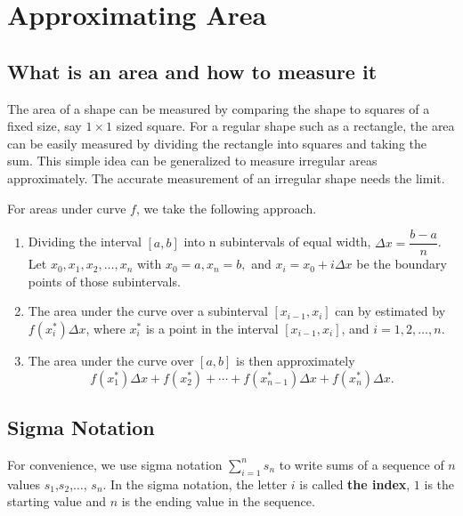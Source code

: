 
\hypertarget{approximating-area}{%
\section{Approximating Area}\label{approximating-area}}

\hypertarget{what-is-an-area-and-how-to-measure-it}{%
\subsection{What is an area and how to measure
it}\label{what-is-an-area-and-how-to-measure-it}}

The area of a shape can be measured by comparing the shape to squares of
a fixed size, say \(1\times1\) sized square. For a regular shape such as
a rectangle, the area can be easily measured by dividing the rectangle
into squares and taking the sum. This simple idea can be generalized to
measure irregular areas approximately. The accurate measurement of an
irregular shape needs the limit.

For areas under curve \(f\), we take the following approach.

\begin{enumerate}[sepno]
\item
  Dividing the interval \([a,b]\) into n subintervals of equal width,
  \(\Delta x=\dfrac{b - a}{n}\). Let \(x_0,x_1,x_2, \dots ,x_n\) with
  \(x_0=a,x_n=b,\) and \(x_i=x_0+i\Delta x\) be the boundary points of
  those subintervals.
\item
  The area under the curve over a subinterval \([x_{i-1}, x_i]\) can by
  estimated by \(f(x_i^*)\Delta x\), where \(x_i^*\) is a point in the
  interval \([x_{i-1}, x_i]\), and \(i=1,2,\dots, n\).
\item
  The area under the curve over \([a, b]\) is then approximately
  \[ f(x_1^*)\Delta x+f(x_2^*)+\cdots +f(x_{n-1}^*)\Delta x+f(x_n^*)\Delta x.\]
\end{enumerate}



\hypertarget{sigma-notation}{%
\subsection{Sigma Notation}\label{sigma-notation}}

For convenience, we use sigma notation \(\sum\limits_{i=1}^n s_n\) to
write sums of a sequence of \(n\) values \(s_1\),\(s_2\),\(\dots\),
\(s_n\). In the sigma notation, the letter \(i\) is called \textbf{the
index}, \(1\) is the starting value and \(n\) is the ending value in the
sequence.


